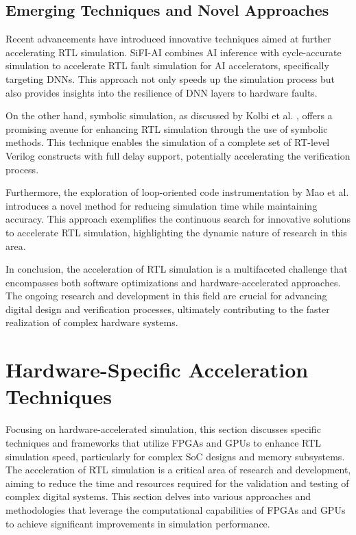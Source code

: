\documentclass[conference]{IEEEtran}
\begin{document}
\subsection{Emerging Techniques and Novel Approaches}

Recent advancements have introduced innovative techniques aimed at further accelerating RTL simulation. SiFI-AI \cite{hoeferSiFIAIFastFlexible2023a} combines AI inference with cycle-accurate simulation to accelerate RTL fault simulation for AI accelerators, specifically targeting DNNs. This approach not only speeds up the simulation process but also provides insights into the resilience of DNN layers to hardware faults.

On the other hand, symbolic simulation, as discussed by Kolbi et al. \cite{kolbiSymbolicRTLSimulation}, offers a promising avenue for enhancing RTL simulation through the use of symbolic methods. This technique enables the simulation of a complete set of RT-level Verilog constructs with full delay support, potentially accelerating the verification process.

Furthermore, the exploration of loop-oriented code instrumentation by Mao et al. \cite{maoAcceleratingLoopOrientedRTL2023} introduces a novel method for reducing simulation time while maintaining accuracy. This approach exemplifies the continuous search for innovative solutions to accelerate RTL simulation, highlighting the dynamic nature of research in this area.

In conclusion, the acceleration of RTL simulation is a multifaceted challenge that encompasses both software optimizations and hardware-accelerated approaches. The ongoing research and development in this field are crucial for advancing digital design and verification processes, ultimately contributing to the faster realization of complex hardware systems.
\section{Hardware-Specific Acceleration Techniques}

Focusing on hardware-accelerated simulation, this section discusses specific techniques and frameworks that utilize FPGAs and GPUs to enhance RTL simulation speed, particularly for complex SoC designs and memory subsystems. The acceleration of RTL simulation is a critical area of research and development, aiming to reduce the time and resources required for the validation and testing of complex digital systems. This section delves into various approaches and methodologies that leverage the computational capabilities of FPGAs and GPUs to achieve significant improvements in simulation performance.
\end{document}
